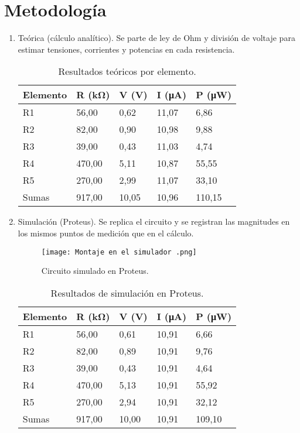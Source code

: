 \documentclass[conference]{IEEEtran}
\begin{document}
\section{Metodología}
\label{sec:metodologia}
\begin{enumerate}[label=\alph*)]
  \item Teórica (cálculo analítico). Se parte de ley de Ohm y división de voltaje para estimar tensiones, corrientes y potencias en cada resistencia.
  \begin{table}[H]
    \centering
    \begin{tabular}{@{}lllll@{}}
      \toprule
      Elemento & R (k\si{\ohm}) & V (V) & I (\si{\micro\ampere}) & P (\si{\micro\watt}) \\
      \midrule
      R1 & 56,00 & 0,62 & 11,07 & 6,86 \\
      R2 & 82,00 & 0,90 & 10,98 & 9,88 \\
      R3 & 39,00 & 0,43 & 11,03 & 4,74 \\
      R4 & 470,00 & 5,11 & 10,87 & 55,55 \\
      R5 & 270,00 & 2,99 & 11,07 & 33,10 \\
      Sumas & 917,00 & 10,05 & 10,96 & 110,15 \\
      \bottomrule
    \end{tabular}
    \caption{Resultados te\'oricos por elemento.}
    \label{tab:teoricos}
  \end{table}

  \item Simulación (Proteus). Se replica el circuito y se registran las magnitudes en los mismos puntos de medición que en el cálculo.
  \begin{figure}[H]
    \centering
    \texttt{[image: Montaje en el simulador .png]}
    \caption{Circuito simulado en Proteus.}
    \label{fig:proteus}
  \end{figure}
  \begin{table}[H]
    \centering
    \begin{tabular}{@{}lllll@{}}
      \toprule
      Elemento & R (k\si{\ohm}) & V (V) & I (\si{\micro\ampere}) & P (\si{\micro\watt}) \\
      \midrule
      R1 & 56,00 & 0,61 & 10,91 & 6,66 \\
      R2 & 82,00 & 0,89 & 10,91 & 9,76 \\
      R3 & 39,00 & 0,43 & 10,91 & 4,64 \\
      R4 & 470,00 & 5,13 & 10,91 & 55,92 \\
      R5 & 270,00 & 2,94 & 10,91 & 32,12 \\
      Sumas & 917,00 & 10,00 & 10,91 & 109,10 \\
      \bottomrule
    \end{tabular}
    \caption{Resultados de simulaci\'on en Proteus.}
    \label{tab:sim}
  \end{table}


\end{enumerate}
\end{document}
